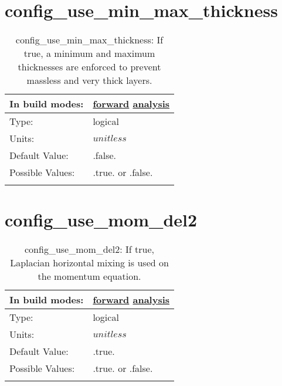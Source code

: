 \section[config\_use\_min\_max\_thickness]{config\_use\_min\_max\_thickness}
\label{sec:nm_sec_config_use_min_max_thickness}
\begin{center}
\begin{longtable}{| p{2.0in} || p{4.0in} |}
    \hline
    In build modes: & \hyperref[subsec:forward_nm_tab_ALE_vertical_grid]{forward} \hyperref[subsec:analysis_nm_tab_ALE_vertical_grid]{analysis} \\
    \hline
    Type: & logical \\
    \hline
    Units: & $unitless$ \\
    \hline
    Default Value: & .false. \\
    \hline
    Possible Values: & .true. or .false. \\
    \hline
    \caption{config\_use\_min\_max\_thickness: If true, a minimum and maximum thicknesses are enforced to prevent massless and very thick layers.}
\end{longtable}
\end{center}
\section[config\_use\_mom\_del2]{config\_use\_mom\_del2}
\label{sec:nm_sec_config_use_mom_del2}
\begin{center}
\begin{longtable}{| p{2.0in} || p{4.0in} |}
    \hline
    In build modes: & \hyperref[subsec:forward_nm_tab_hmix_del2]{forward} \hyperref[subsec:analysis_nm_tab_hmix_del2]{analysis} \\
    \hline
    Type: & logical \\
    \hline
    Units: & $unitless$ \\
    \hline
    Default Value: & .true. \\
    \hline
    Possible Values: & .true. or .false. \\
    \hline
    \caption{config\_use\_mom\_del2: If true, Laplacian horizontal mixing is used on the momentum equation.}
\end{longtable}
\end{center}

